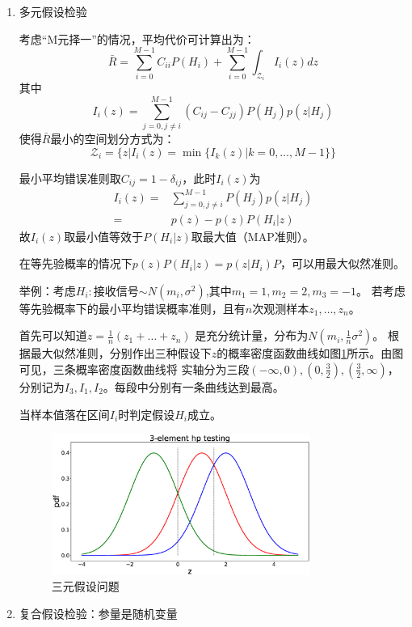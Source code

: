 \documentclass{article}
\begin{document}
\begin{enumerate}
\item 多元假设检验

考虑“M元择一”的情况，平均代价可计算出为：
$$
\bar{R}=\sum_{i=0}^{M-1} C_{ii}P(H_i) + \sum_{i=0}^{M-1} \int_{\mathcal{Z}_i} I_i(z)dz
$$
其中
$$
I_i(z) =\sum_{j=0,j\neq i}^{M-1} (C_{ij}-C_{jj})P(H_j)p(z|H_j)
$$
使得$\bar{R}$最小的空间划分方式为：
$$
\mathcal{Z}_i=\{z|I_i(z)=\min \{I_k(z)|k=0,\dots,M-1\}\}
$$

最小平均错误准则取$C_{ij}=1-\delta_{ij}$，此时$I_i(z)$为
\begin{align}
I_i(z)  = & \sum_{j=0,j\neq i}^{M-1} P(H_j)p(z|H_j) \\
        = & p(z)-p(z)P(H_i|z)
\end{align}
故$I_i(z)$取最小值等效于$P(H_i|z)$取最大值（MAP准则）。

在等先验概率的情况下$p(z)P(H_i|z)=p(z|H_i)P$，可以用最大似然准则。

举例：考虑$H_i:$接收信号$\sim N(m_i,\sigma^2)$,其中$m_1=1,m_2=2,m_3=-1$。
若考虑等先验概率下的最小平均错误概率准则，且有$n$次观测样本$z_1,\dots,z_n$。

首先可以知道$z=\frac{1}{n}(z_1+\dots+z_n)$ 是充分统计量，分布为$N(m_i,\frac{1}{n}\sigma^2)$。
根据最大似然准则，分别作出三种假设下$z$的概率密度函数曲线如图\ref{fig:3meta_hpt}所示。由图可见，三条概率密度函数曲线将
实轴分为三段$(-\infty,0),(0,\frac{3}{2}),(\frac{3}{2},\infty)$，分别记为$I_3,I_1,I_2$。每段中分别有一条曲线达到最高。

当样本值落在区间$I_i$时判定假设$H_i$成立。

\begin{figure}[!ht]
\centering
\includegraphics[width=0.8\textwidth]{3meta_hpt.eps}
\caption{三元假设问题}\label{fig:3meta_hpt}
\end{figure}

\item 复合假设检验：参量是随机变量


\end{enumerate}
\end{document}
